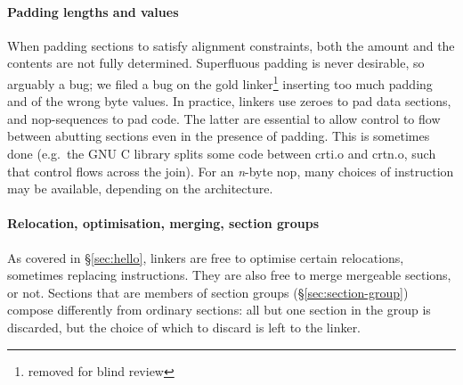 \documentclass[preprint,10pt]{sigplanconf-pldi16}
\begin{document}
\paragraph{Padding lengths and values}
When padding sections to satisfy alignment constraints, 
both the amount and the contents are not fully determined.
Superfluous padding is never desirable, so arguably a bug; 
we filed a bug on the \textsf{gold} linker\footnote{%
removed for blind review} inserting too much padding 
and of the wrong byte values.
In practice, linkers use zeroes to pad data sections, and \textsf{nop}-sequences to pad code.
The latter are essential to allow control to flow between abutting sections
even in the presence of padding. 
This is sometimes done (e.g.\ the GNU C library splits some code between
\textsf{crti.o} and \textsf{crtn.o}, such that control flows across the join).
For an \textit{n}-byte \textsf{nop}, many choices of instruction may be available, 
depending on the architecture.


\paragraph{Relocation, optimisation, merging, section groups}
As covered in \S\ref{sec:hello}, 
linkers are free to optimise certain relocations, sometimes replacing instructions.
They are also free to merge mergeable sections, or not.
Sections that are members of section groups (\S\ref{sec:section-group}) compose differently
from ordinary sections: all but one section in the group is discarded,
but the choice of which to discard is left to the linker.
\end{document}
